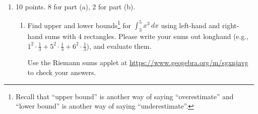 \documentclass{article}
\begin{document}
\begin{enumerate}

\item 

\begin{grading}
10 points. 8 for part (a), 2 for part (b).
\end{grading}

\begin{enumerate}[topsep=0pt]
  \item
    \begin{problem}[\vfill]
      Find upper and lower bounds\footnote{Recall that ``upper bound'' is
        another way of saying ``overestimate'' and ``lower bound'' is
        another way of saying ``underestimate''.} for $\displaystyle
      \int_3^5 x^3\,dx$ using left-hand and right-hand sums with 4
      rectangles.  Please write your sums out longhand (e.g., $1^2 \cdot
      \frac{1}{3} + 5^2 \cdot \frac{1}{3} + 6^2 \cdot \frac{1}{3}$), and
      evaluate them.

      Use the Riemann sums applet at
      \url{https://www.geogebra.org/m/sgxnjavg} to check your
      answers.
    \end{problem}


\end{enumerate}
\end{enumerate}
\end{document}
